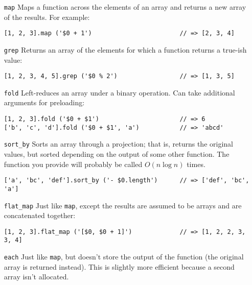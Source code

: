 \documentclass{report}
\begin{document}
\begin{enumerate}
\item[{\tt map}]      Maps a function across the elements of an array and returns a new array of the results. For example:

\begin{verbatim}
[1, 2, 3].map ('$0 + 1')                        // => [2, 3, 4]
\end{verbatim}

\item[{\tt grep}]     Returns an array of the elements for which a function returns a true-ish value:

\begin{verbatim}
[1, 2, 3, 4, 5].grep ('$0 % 2')                 // => [1, 3, 5]
\end{verbatim}

\item[{\tt fold}]     Left-reduces an array under a binary operation. Can take additional arguments for preloading:

\begin{verbatim}
[1, 2, 3].fold ('$0 + $1')                      // => 6
['b', 'c', 'd'].fold ('$0 + $1', 'a')           // => 'abcd'
\end{verbatim}

\item[{\tt sort\_by}] Sorts an array through a projection; that is, returns the original values, but sorted depending on the output of some other function. The function you provide will
                        probably be called $O(n \log n)$ times.

\begin{verbatim}
['a', 'bc', 'def'].sort_by ('- $0.length')      // => ['def', 'bc', 'a']
\end{verbatim}

\item[{\tt flat\_map}] Just like \verb|map|, except the results are assumed to be arrays and are concatenated together:

\begin{verbatim}
[1, 2, 3].flat_map ('[$0, $0 + 1]')             // => [1, 2, 2, 3, 3, 4]
\end{verbatim}

\item[{\tt each}]     Just like \verb|map|, but doesn't store the output of the function (the original array is returned instead). This is slightly more efficient because a second array
                        isn't allocated.
\end{enumerate}
\end{document}
